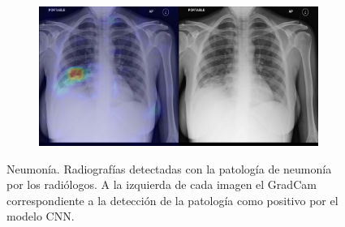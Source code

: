 \begin{figure}[b]
\begin{subfigure}{0.4\textwidth}
    \end{subfigure}
    \begin{subfigure}{0.4\textwidth}
        \centering
        \includegraphics[width=1.0\textwidth]{Chapters/5. Conclusiones/img/Pneumonia/1_1_1d9ec3ad-0120-428b-9778-3805f9348092.png}
    \end{subfigure}

    \caption[short]{Neumonía. Radiografías detectadas con la patología de neumonía por los
                    radiólogos. A la izquierda de cada imagen el GradCam correspondiente a la detección
                    de la patología como positivo por el modelo CNN.}
\end{figure}

